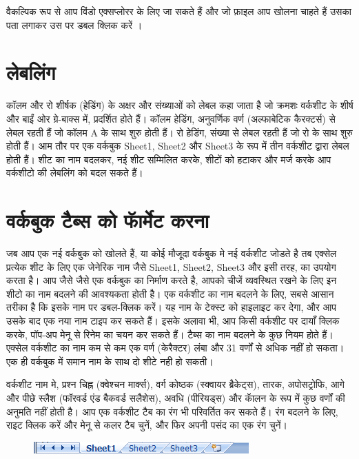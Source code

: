 वैकल्पिक रूप से आप विंडो एक्सप्लोरर के लिए जा सकते हैं और जो फ़ाइल आप खोलना चाहते हैं उसका पता लगाकर उस पर डबल क्लिक करें ।

\section{लेबलिंग}\label{id-1.5}

कॉलम और रो शीर्षक (हेडिंग) के अक्षर और संख्याओं को लेबल कहा जाता है जो क्रमशः वर्कशीट के शीर्ष और बाईं ओर ग्रे-बाक्स में, प्रदर्शित होते हैं। कॉलम हेडिंग, अनुवर्णिक वर्ण (अल्फाबेटिक कैरक्टर्स) से लेबल रहती हैं जो कॉलम {\eng A} के साथ शुरु होती हैं। रो हेडिंग, संख्या से लेबल रहती हैं जो रो {} के साथ शुरु होती हैं। आम तौर पर एक वर्कबुक {\eng Sheet1, Sheet2} और {\eng Sheet3} के रूप में तीन वर्कशीट द्वारा लेबल होती हैं। शीट का नाम बदलकर, नई शीट सम्मिलित करकेे, शीटों को हटाकर और मर्ज करके आप वर्कशीटो की लेबलिंग को बदल सकते हैं।

\section{वर्कबुक टैब्स को फॅार्मेट करना}\label{id-1.6}

जब आप एक नई वर्कबुक को खोलते हैं, या कोई मौजूदा वर्कबुक मे नई वर्कशीट जोडते है तब एक्सेल प्रत्येक शीट के लिए एक जेनेरिक नाम जैसे  {\eng Sheet1, Sheet2, Sheet3}  और इसी तरह, का उपयोग करता है। आप जैसे जैसे एक वर्कबुक का निर्माण करते है, आपको चीजें व्यवस्थित रखने के लिए इन शीटो का नाम बदलने की आवश्यकता होती है। एक वर्कशीट का नाम बदलने के लिए, सबसे आसान तरीका है कि इसके नाम पर डबल-क्लिक करें। यह नाम के टेक्स्ट को हाइलाइट कर देगा, और आप उसके बाद एक नया नाम टाइप कर सकते हैं। इसके अलावा भी, आप किसी वर्कशीट पर दायाँ क्लिक करके, पॉप-अप मेनू से रिनेम का चयन कर सकते हैं। टैब्स का नाम बदलने के कुछ नियम होते हैं। एक्सेल वर्कशीट का नाम कम से कम एक वर्ण (केरैक्टर) लंबा और 31 वर्णों से अधिक नहीं हो सकता। एक ही वर्कबुक में समान नाम के साथ दो शीटे नही हो सकती।

वर्कशीट नाम मे, प्रश्न चिह्न (क्वेश्चन मार्क्स), वर्ग कोष्ठक (स्क्वायर ब्रैकेट्स), तारक, अपोसट्रोफि, आगे और पीछे स्लैश (फॉरवर्ड एंड बैकवर्ड सलैशेस), अवधि (पीरियड्स) और कॅालन के रूप में कुछ वर्णों की अनुमति नहीं होती है। आप एक वर्कशीट टैब का रंग भी परिवर्तित कर सकते हैं। रंग बदलने के लिए, राइट क्लिक करें और मेनू से कलर टैब चुनें, और फिर अपनी पसंद का एक रंग चुनें।
\begin{figure}[H]
\centering
\includegraphics[scale=0.7]{src/images/chapter1/chapter1_fig07.png}
\end{figure}

